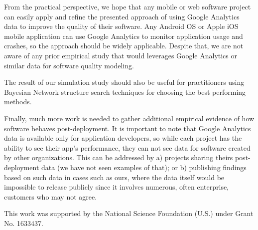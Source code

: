 \documentclass[smallextended]{svjour3}       %
\begin{document}
From the practical perspective, we hope that any mobile or web
software project can easily apply and refine the presented approach
of using Google Analytics data to improve the quality of their
software.  Any Android OS or Apple iOS mobile application can use
Google Analytics to monitor application usage and crashes, so the
approach should be widely applicable. Despite that, we 
are not aware of any prior empirical study that would leverages Google
Analytics or similar data for software quality modeling.

The result of our simulation study should also be useful for practitioners 
using Bayesian Network structure search techniques for choosing the best performing methods.


Finally, much more work is needed to gather additional empirical
evidence of how software behaves post-deployment. It is important to
note that Google Analytics data is available only for application
developers, so while each project has the ability to see their app's
performance, they can not see data for software created by other
organizations. This can be addressed by a) projects sharing theirs
post-deployment data (we have not seen examples of that); or b)
publishing findings based on such data in cases such as ours,
where the data itself would be impossible to release publicly since
it involves numerous, often enterprise, customers who may not agree.




\begin{acknowledgements}
This work was supported by the National Science Foundation (U.S.) under Grant No. 1633437.
\end{acknowledgements}

\end{document}
